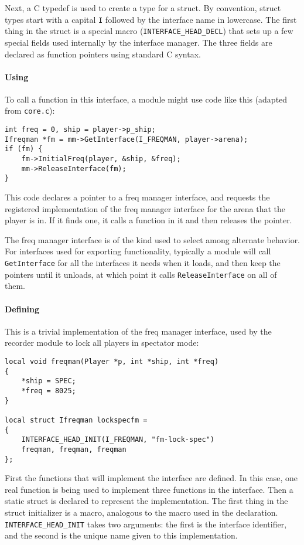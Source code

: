 \documentclass{article}
\begin{document}
Next, a C typedef is used to create a type for a struct. By convention,
struct types start with a capital \verb/I/ followed by the interface
name in lowercase. The first thing in the struct is a special macro
(\verb/INTERFACE_HEAD_DECL/) that sets up a few special fields used
internally by the interface manager. The three fields are declared as
function pointers using standard C syntax.

\paragraph{Using}
To call a function in this interface, a module might use code like this
(adapted from \verb/core.c/):

\begin{verbatim}
int freq = 0, ship = player->p_ship;
Ifreqman *fm = mm->GetInterface(I_FREQMAN, player->arena);
if (fm) {
    fm->InitialFreq(player, &ship, &freq);
    mm->ReleaseInterface(fm);
}
\end{verbatim}

This code declares a pointer to a freq manager interface, and requests
the registered implementation of the freq manager interface for the
arena that the player is in. If it finds one, it calls a function in it
and then releases the pointer.

The freq manager interface is of the kind used to select among alternate
behavior. For interfaces used for exporting functionality, typically a
module will call \verb/GetInterface/ for all the interfaces it needs
when it loads, and then keep the pointers until it unloads, at which
point it calls \verb/ReleaseInterface/ on all of them.

\paragraph{Defining}

This is a trivial implementation of the freq manager interface, used by
the recorder module to lock all players in spectator mode:

\begin{verbatim}
local void freqman(Player *p, int *ship, int *freq)
{
    *ship = SPEC;
    *freq = 8025;
}

local struct Ifreqman lockspecfm =
{
    INTERFACE_HEAD_INIT(I_FREQMAN, "fm-lock-spec")
    freqman, freqman, freqman
};
\end{verbatim}

First the functions that will implement the interface are defined. In
this case, one real function is being used to implement three functions
in the interface. Then a static struct is declared to represent the
implementation. The first thing in the struct initializer is a macro,
analogous to the macro used in the declaration.
\verb/INTERFACE_HEAD_INIT/ takes two arguments: the first is the
interface identifier, and the second is the unique name given to this
implementation.
\end{document}
